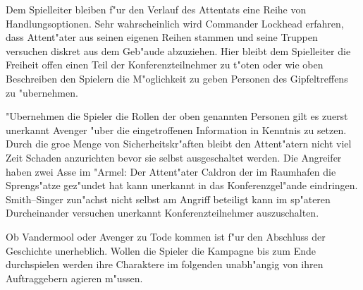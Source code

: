 \begin{remarks}
	Dem Spielleiter bleiben f"ur den Verlauf des Attentats eine Reihe von Handlungsoptionen. Sehr wahrscheinlich wird Commander Lockhead erfahren, dass Attent"ater aus seinen eigenen Reihen stammen und seine Truppen versuchen diskret aus dem Geb"aude abzuziehen. Hier bleibt dem Spielleiter die Freiheit offen einen Teil der Konferenzteilnehmer zu t"oten oder wie oben Beschreiben den Spielern die M"oglichkeit zu geben Personen des Gipfeltreffens zu "ubernehmen.
	
	"Ubernehmen die Spieler die Rollen der oben genannten Personen gilt es zuerst unerkannt Avenger "uber die eingetroffenen Information in Kenntnis zu setzen. Durch die gro\3e Menge von Sicherheitskr"aften bleibt den Attent"atern nicht viel Zeit Schaden anzurichten bevor sie selbst ausgeschaltet werden. Die Angreifer haben zwei Asse im "Armel: Der Attent"ater Caldron der im Raumhafen die Sprengs"atze gez"undet hat kann unerkannt in das Konferenzgel"ande eindringen. Smith--Singer zun"achst nicht selbst am Angriff beteiligt kann im sp"ateren Durcheinander versuchen unerkannt Konferenzteilnehmer auszuschalten.
	
	Ob Vandermool oder Avenger zu Tode kommen ist f"ur den Abschluss der Geschichte unerheblich. Wollen die Spieler die Kampagne bis zum Ende durchspielen werden ihre Charaktere im folgenden unabh"angig von ihren Auftraggebern agieren m"ussen.
\end{remarks}
